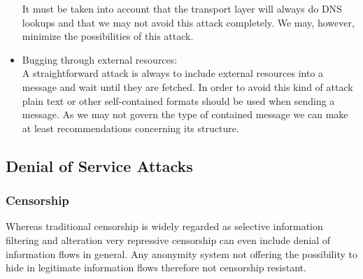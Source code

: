 \begin{itemize}
          It must be taken into account that the transport layer will always do DNS lookups and that we may not avoid this attack completely. We may, however, minimize the possibilities of this attack.

    \item Bugging through external resources:\\
          A straightforward attack is always to include external resources into a message and wait until they are fetched. In order to avoid this kind of attack plain text or other self-contained formats should be used when sending a message. As we may not govern the type of contained message we can make at least recommendations concerning its structure.
\end{itemize}

\subsection{Denial of Service Attacks}
\subsubsection{Censorship}
Whereas traditional censorship is widely regarded as selective information filtering and alteration very repressive censorship can even include denial of information flows in general. Any anonymity system not offering the possibility to hide in legitimate information flows therefore not censorship resistant.

